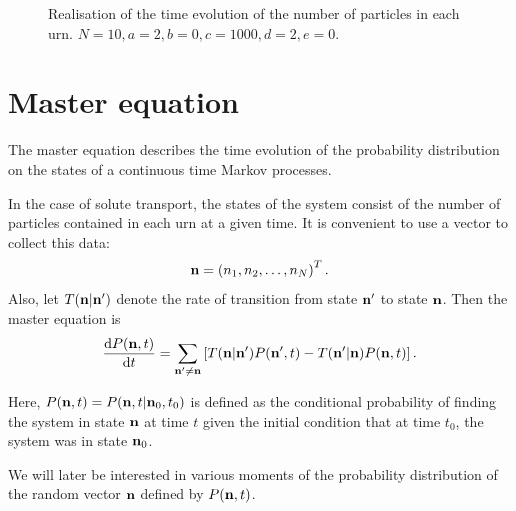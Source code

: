 \begin{figure}[ht!]
    \centering
    {
    }

    \caption{\label{fig:exreal2}Realisation of the time evolution of the number
of particles in each urn. \(N=10,a=2,b=0,c=1000,d=2,e=0\).}
\end{figure}

\FloatBarrier

\section{Master equation}
The master equation describes the time evolution of the probability distribution
on the states of a continuous time Markov processes.

%

In the case of solute transport, the states of the system consist of the number
of particles contained in each urn at a given time. It is convenient to use a
vector to collect this data:
\begin{equation}
    \label{eqn:state_vector}
    \mathbf{n} = \left(n_1,n_2, \dotsc, n_N\right)^{T}.
\end{equation}
Also, let \(T(\mathbf{n}|\mathbf{n}')\) denote the rate of transition from state \(\mathbf{n}'\)
to state \(\mathbf{n}\). Then the master equation is \citep{mckane2012stochastic}
\begin{equation}
    \label{eqn:master_eqn_rates}
    \frac{\mathrm{d} P(\mathbf{n},t)}{\mathrm{d} t} = \sum_{\mathbf{n}' \neq \mathbf{n}} \left[ T(\mathbf{n}|\mathbf{n}')
        P(\mathbf{n}',t) - T(\mathbf{n}'|\mathbf{n}) P(\mathbf{n},t) \right].
\end{equation}

Here, \(P(\mathbf{n},t) = P(\mathbf{n},t | \mathbf{n}_0, t_0)\) is defined as the conditional probability of finding the
system in state \(\mathbf{n}\) at time \(t\) given the initial condition that at time
\(t_0\), the system was in state \(\mathbf{n}_0\).

We will later be interested in various moments of the probability distribution
of the random vector \(\mathbf{n}\) defined by \(P(\mathbf{n},t)\).

